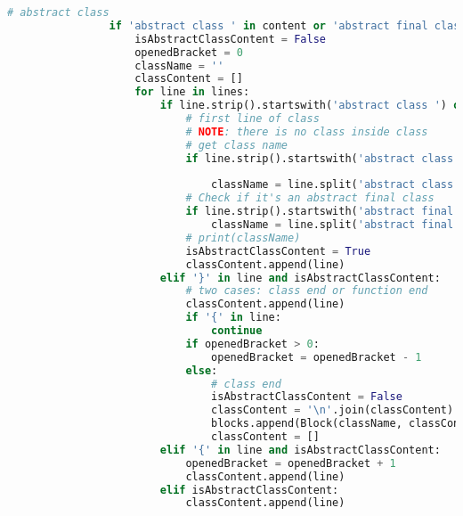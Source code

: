 \begin{lstlisting}[language=Python, caption={$\texttt{ContainAnalyzer}$ function.}, label={lst:10}]
                # abstract class
                if 'abstract class ' in content or 'abstract final class ' in content:
                    isAbstractClassContent = False
                    openedBracket = 0
                    className = ''
                    classContent = []
                    for line in lines:
                        if line.strip().startswith('abstract class ') or line.strip().startswith('abstract final class '):
                            # first line of class
                            # NOTE: there is no class inside class
                            # get class name
                            if line.strip().startswith('abstract class '):
                                
                                className = line.split('abstract class ')[1].split('{')[0].strip()
                            # Check if it's an abstract final class
                            if line.strip().startswith('abstract final class '):
                                className = line.split('abstract final class ')[1].split('{')[0].strip()
                            # print(className)
                            isAbstractClassContent = True
                            classContent.append(line)
                        elif '}' in line and isAbstractClassContent:
                            # two cases: class end or function end
                            classContent.append(line)
                            if '{' in line:
                                continue
                            if openedBracket > 0:
                                openedBracket = openedBracket - 1
                            else: 
                                # class end
                                isAbstractClassContent = False
                                classContent = '\n'.join(classContent)
                                blocks.append(Block(className, classContent, BlockType.ABSTRACT_CLASS))
                                classContent = []
                        elif '{' in line and isAbstractClassContent:
                            openedBracket = openedBracket + 1
                            classContent.append(line)
                        elif isAbstractClassContent:
                            classContent.append(line)
                            

\end{lstlisting}
